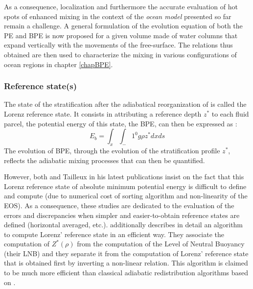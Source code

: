As a consequence, localization and furthermore the accurate evaluation of hot spots of enhanced mixing in the context of the \textit{ocean model} presented so far remain a challenge. A general formulation of the evolution equation of both the PE and BPE is now proposed for a given volume made of water columns that expand vertically with the movements of the free-surface. The relations thus obtained are then used to characterize the mixing in various configurations of ocean regions in chapter \ref{chapBPE}.


\subsubsection{Reference state(s)}

The state of the stratification after the adiabatical reorganization of \citet{lorenz_available_1955} is called the Lorenz reference state. It consists in attributing a reference depth $z^*$ to each fluid parcel, the potential energy of this state, the BPE, can then be expressed as :
\begin{equation}
    E_b = \int_x \int_-1^0 g \rho z^* dx ds
\end{equation}
The evolution of BPE, through the evolution of the stratification profile $z^*$, reflects the adiabatic mixing processes that can then be quantified.

However, both \cite{saenz_estimating_2015} and Tailleux in his latest publications \citep{tailleux_local_2018} insist on the fact that this Lorenz reference state of absolute minimum potential energy is difficult to define and compute \color{red}(due to numerical cost of sorting algorithm and non-linearity of the EOS)\color{black}. As a consequence, these studies are dedicated to the evaluation of the errors and discrepancies when simpler and easier-to-obtain reference states are defined (horizontal averaged, etc.). \cite{saenz_estimating_2015} additionally describes in detail an algorithm to compute Lorenz' reference state in an efficient way. They associate the computation of $Z^*(\rho)$ from the computation of the Level of Neutral Buoyancy (their LNB) and they separate it from the computation of Lorenz' reference state that is obtained first by inverting a non-linear relation. This algorithm is claimed to be much more efficient than classical adiabatic redistribution algorithms based on \citet{winters_available_1995}.

